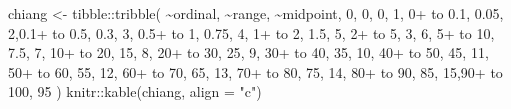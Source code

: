 \documentclass[
  letterpaper,
  DIV=11,
  numbers=noendperiod]{scrreprt}
\newenvironment{Shaded}{\begin{snugshade}}{\end{snugshade}}
\newcommand{\AttributeTok}[1]{\textcolor[rgb]{0.40,0.45,0.13}{#1}}
\newcommand{\DecValTok}[1]{\textcolor[rgb]{0.68,0.00,0.00}{#1}}
\newcommand{\FloatTok}[1]{\textcolor[rgb]{0.68,0.00,0.00}{#1}}
\newcommand{\FunctionTok}[1]{\textcolor[rgb]{0.28,0.35,0.67}{#1}}
\newcommand{\NormalTok}[1]{\textcolor[rgb]{0.00,0.23,0.31}{#1}}
\newcommand{\OtherTok}[1]{\textcolor[rgb]{0.00,0.23,0.31}{#1}}
\newcommand{\SpecialCharTok}[1]{\textcolor[rgb]{0.37,0.37,0.37}{#1}}
\newcommand{\StringTok}[1]{\textcolor[rgb]{0.13,0.47,0.30}{#1}}
\begin{document}
\begin{Shaded}
\begin{Highlighting}[]
\NormalTok{chiang }\OtherTok{\textless{}{-}}\NormalTok{ tibble}\SpecialCharTok{::}\FunctionTok{tribble}\NormalTok{(}
  \SpecialCharTok{\textasciitilde{}}\NormalTok{ordinal, }\SpecialCharTok{\textasciitilde{}}\StringTok{\textquotesingle{}range\textquotesingle{}}\NormalTok{, }\SpecialCharTok{\textasciitilde{}}\NormalTok{midpoint,}
  \DecValTok{0}\NormalTok{,          }\StringTok{\textquotesingle{}0\textquotesingle{}}\NormalTok{,     }\DecValTok{0}\NormalTok{,   }
  \DecValTok{1}\NormalTok{,  }\StringTok{\textquotesingle{}0+ to 0.1\textquotesingle{}}\NormalTok{,  }\FloatTok{0.05}\NormalTok{,   }
  \DecValTok{2}\NormalTok{,}\StringTok{\textquotesingle{}0.1+ to 0.5\textquotesingle{}}\NormalTok{,   }\FloatTok{0.3}\NormalTok{,   }
  \DecValTok{3}\NormalTok{,  }\StringTok{\textquotesingle{}0.5+ to 1\textquotesingle{}}\NormalTok{,  }\FloatTok{0.75}\NormalTok{,  }
  \DecValTok{4}\NormalTok{,    }\StringTok{\textquotesingle{}1+ to 2\textquotesingle{}}\NormalTok{,   }\FloatTok{1.5}\NormalTok{, }
  \DecValTok{5}\NormalTok{,    }\StringTok{\textquotesingle{}2+ to 5\textquotesingle{}}\NormalTok{,     }\DecValTok{3}\NormalTok{, }
  \DecValTok{6}\NormalTok{,   }\StringTok{\textquotesingle{}5+ to 10\textquotesingle{}}\NormalTok{,   }\FloatTok{7.5}\NormalTok{, }
  \DecValTok{7}\NormalTok{,  }\StringTok{\textquotesingle{}10+ to 20\textquotesingle{}}\NormalTok{,    }\DecValTok{15}\NormalTok{, }
  \DecValTok{8}\NormalTok{,  }\StringTok{\textquotesingle{}20+ to 30\textquotesingle{}}\NormalTok{,    }\DecValTok{25}\NormalTok{, }
  \DecValTok{9}\NormalTok{,  }\StringTok{\textquotesingle{}30+ to 40\textquotesingle{}}\NormalTok{,    }\DecValTok{35}\NormalTok{, }
  \DecValTok{10}\NormalTok{, }\StringTok{\textquotesingle{}40+ to 50\textquotesingle{}}\NormalTok{,    }\DecValTok{45}\NormalTok{,  }
  \DecValTok{11}\NormalTok{, }\StringTok{\textquotesingle{}50+ to 60\textquotesingle{}}\NormalTok{,    }\DecValTok{55}\NormalTok{,}
  \DecValTok{12}\NormalTok{, }\StringTok{\textquotesingle{}60+ to 70\textquotesingle{}}\NormalTok{,    }\DecValTok{65}\NormalTok{,}
  \DecValTok{13}\NormalTok{, }\StringTok{\textquotesingle{}70+ to 80\textquotesingle{}}\NormalTok{,    }\DecValTok{75}\NormalTok{,}
  \DecValTok{14}\NormalTok{, }\StringTok{\textquotesingle{}80+ to 90\textquotesingle{}}\NormalTok{,    }\DecValTok{85}\NormalTok{,}
  \DecValTok{15}\NormalTok{,}\StringTok{\textquotesingle{}90+ to 100\textquotesingle{}}\NormalTok{,   }\DecValTok{95}
\NormalTok{  )}
\NormalTok{knitr}\SpecialCharTok{::}\FunctionTok{kable}\NormalTok{(chiang, }\AttributeTok{align =} \StringTok{"c"}\NormalTok{)}
\end{Highlighting}
\end{Shaded}
\end{document}
